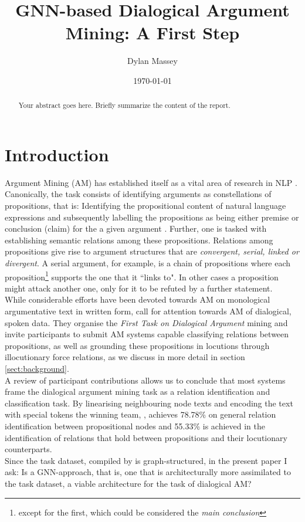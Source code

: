 \documentclass[11pt]{article}
\title{GNN-based Dialogical Argument Mining: A First Step} %
\author{Dylan Massey} %
\date{\today} %
\begin{document}
\maketitle

\begin{abstract}
Your abstract goes here. Briefly summarize the content of the report.
\end{abstract}

\section{Introduction}

Argument Mining (AM) has established itself as a vital area of research in NLP \citep{stede_argumentation_2019}. Canonically, the task consists of identifying arguments as constellations of propositions, that is: Identifying the propositional content of natural language expressions and subsequently labelling the propositions as being either premise or conclusion (claim) for the a given argument \citep{stede_argumentation_2019}. Further, one is tasked with establishing semantic relations among these propositions. Relations among propositions give rise to argument structures that are \textit{convergent, serial, linked or divergent}\citep{lawrence_argument_2019}. A serial argument, for example, is a chain of propositions where each proposition\footnote{except for the first, which could be considered the \textit{main conclusion}} supports the one that it ``links to". In other cases a proposition might attack another one, only for it to be refuted by a further statement. \\
While considerable efforts have been devoted towards AM on monological argumentative text in written form, \citet{ruiz-dolz_overview_2024} call for attention towards AM of dialogical, spoken data. They organise the \textit{First Task on Dialogical Argument} mining and invite participants to submit AM systems capable classifying relations between propositions, as well as grounding these propositions in locutions through illocutionary force relations, as we discuss in more detail in section \ref{sect:background}. \\
A review of participant contributions allows us to conclude that most systems frame the dialogical argument mining task as a relation identification and classification task. By linearising neighbouring node texts and encoding the text with special tokens the winning team, \citet{binder_dfki-mlst_2024}, achieves 78.78\% on general relation identification between propositional nodes and 55.33\% is achieved in the identification of relations that hold between propositions and their locutionary counterparts. \\
Since the task dataset, compiled by \citet{hautli-janisz_qt30_2022} is graph-structured, in the present paper I ask: Is a GNN-approach, that is, one that is architecturally more assimilated to the task dataset, a viable architecture for the task of dialogical AM?
\end{document}
